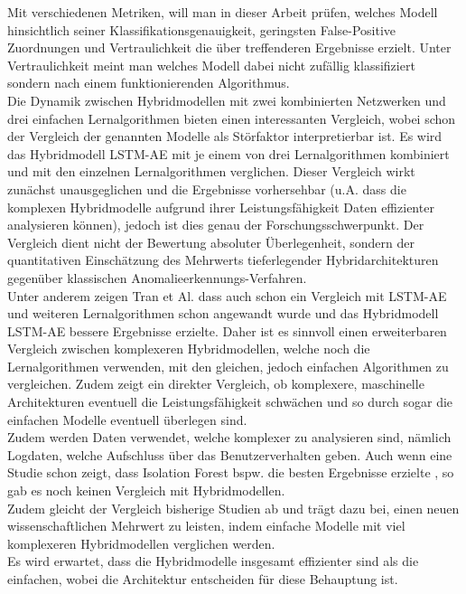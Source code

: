 \documentclass[a4paper,12pt]{article}
\begin{document}
	Mit verschiedenen Metriken, will man in dieser Arbeit prüfen, welches Modell hinsichtlich seiner Klassifikationsgenauigkeit, geringsten False-Positive Zuordnungen und Vertraulichkeit die über treffenderen Ergebnisse erzielt. Unter Vertraulichkeit meint man welches Modell dabei nicht zufällig klassifiziert sondern nach einem funktionierenden Algorithmus.
	\\[0.5em]
	Die Dynamik zwischen Hybridmodellen mit zwei kombinierten Netzwerken und drei einfachen Lernalgorithmen bieten einen interessanten Vergleich, wobei
	schon der Vergleich der genannten Modelle als Störfaktor interpretierbar ist. Es wird das Hybridmodell LSTM-AE mit je einem von drei Lernalgorithmen kombiniert und mit den einzelnen Lernalgorithmen verglichen. Dieser Vergleich wirkt zunächst unausgeglichen und die Ergebnisse vorhersehbar (u.A. dass die komplexen Hybridmodelle aufgrund ihrer Leistungsfähigkeit Daten effizienter analysieren können), jedoch ist dies genau der Forschungsschwerpunkt. Der Vergleich dient nicht der Bewertung absoluter Überlegenheit, sondern der quantitativen Einschätzung des Mehrwerts tieferlegender Hybridarchitekturen gegenüber klassischen Anomalieerkennungs-Verfahren.
	\\[0.5em]
	Unter anderem zeigen Tran et Al. dass auch schon ein Vergleich mit LSTM-AE und weiteren Lernalgorithmen schon angewandt wurde \cite{tran2021forecasting} und das Hybridmodell LSTM-AE bessere Ergebnisse erzielte. Daher ist es sinnvoll einen erweiterbaren Vergleich zwischen komplexeren Hybridmodellen, welche noch die Lernalgorithmen verwenden, mit den gleichen, jedoch einfachen Algorithmen zu vergleichen. Zudem zeigt ein direkter Vergleich, ob komplexere, maschinelle Architekturen eventuell die Leistungsfähigkeit schwächen und so durch sogar die einfachen Modelle eventuell überlegen sind.
	\\[0.5em]
	Zudem werden Daten verwendet, welche komplexer zu analysieren sind, nämlich Logdaten, welche Aufschluss über das Benutzerverhalten geben. Auch wenn eine Studie schon zeigt, dass Isolation Forest bspw. die besten Ergebnisse erzielte \cite{yan2021extended}, so gab es noch keinen Vergleich mit Hybridmodellen.
	\\[0.5em]
	Zudem gleicht der Vergleich bisherige Studien ab und trägt dazu bei, einen neuen wissenschaftlichen Mehrwert zu leisten, indem einfache Modelle mit viel komplexeren Hybridmodellen verglichen werden.
	\\[0.5em]
	Es wird erwartet, dass die Hybridmodelle insgesamt effizienter sind als die einfachen, wobei die Architektur entscheiden für diese Behauptung ist.
\end{document}
